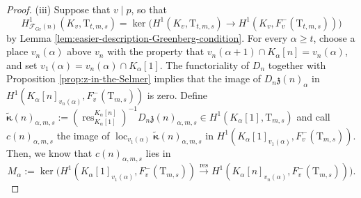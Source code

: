 \documentclass[12pt,reqno]{amsart}
\theoremstyle{definition}
\theoremstyle{remark}
\newcommand{\T}{\boldsymbol{\mathrm{T}}}
\DeclareMathOperator{\res}{res}
\DeclareMathOperator{\loc}{loc}
\newcommand{\Gr}{\mathrm{Gr}}
\newcommand{\ga}{\alpha}
\newcommand{\gk}{\kappa}
\begin{document}
\begin{proof}
(iii) Suppose that $v\mid p$, so that 
\begin{equation*}
    H^1_{\mathcal{F}_{\Gr}(n)}(K_v,\T_{t,m,s})=\ker\big(H^1(K_v,\T_{t,m,s})\to H^1(K_v,F_v^-(\T_{t,m,s}))\big)
\end{equation*}
by Lemma \ref{lem:easier-description-Greenberg-condition}. For every $\ga\ge t$, choose a place $v_n(\ga)$ above $v_n$ with the property that $v_n(\ga+1)\cap K_\ga[n]=v_n(\ga)$, and set $v_1(\ga)=v_n(\ga)\cap K_\ga[1]$. The functoriality of $D_n$ together with Proposition \ref{prop:z-in-the-Selmer} implies that the image of $D_n\mathfrak{z}(n)_{\ga}$ in $H^1(K_\ga[n]_{v_n(\ga)},F_v^-(\T_{m,s}))$ is zero. Define $\tilde{\boldsymbol{\gk}}(n)_{\ga,m,s}:=(\res^{K_\ga[n]}_{K_\ga[1]})^{-1}D_n\mathfrak{z}(n)_{\ga,m,s}\in H^1(K_\ga[1],\T_{m,s})$ and call $c(n)_{\ga,m,s}$ the image of $\loc_{v_1(\ga)}\tilde{\boldsymbol{\gk}}(n)_{\ga,m,s}$ in $H^1(K_\ga[1]_{v_1(\ga)},F_v^-(\T_{m,s}))$. Then, we know that $c(n)_{\ga,m,s}$ lies in
\begin{equation*}
    M_\ga:=\ker\Big( H^1(K_\ga[1]_{v_1(\ga)},F_v^-(\T_{m,s}))\overset{\res}{\longrightarrow} H^1(K_\ga[n]_{v_n(\ga)},F_v^-(\T_{m,s}))\Big).
\end{equation*}


\end{proof}
\end{document}
